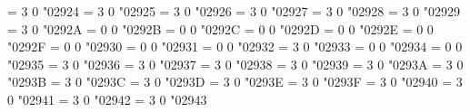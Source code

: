 \Umathchardef\hknearrow = 3 0 "02924 %
\Umathchardef\hksearrow = 3 0 "02925 %
\Umathchardef\hkswarrow = 3 0 "02926 %
\Umathchardef\tona = 3 0 "02927 %
\Umathchardef\toea = 3 0 "02928 %
\Umathchardef\tosa = 3 0 "02929 %
\Umathchardef\towa = 3 0 "0292A %
\Umathchardef\rdiagovfdiag = 0 0 "0292B %
\Umathchardef\fdiagovrdiag = 0 0 "0292C %
\Umathchardef\seovnearrow = 0 0 "0292D %
\Umathchardef\neovsearrow = 0 0 "0292E %
\Umathchardef\fdiagovnearrow = 0 0 "0292F %
\Umathchardef\rdiagovsearrow = 0 0 "02930 %
\Umathchardef\neovnwarrow = 0 0 "02931 %
\Umathchardef\nwovnearrow = 0 0 "02932 %
\Umathchardef\rightcurvedarrow = 3 0 "02933 %
\Umathchardef\uprightcurvearrow = 0 0 "02934 %
\Umathchardef\downrightcurvedarrow = 0 0 "02935 %
\Umathchardef\leftdowncurvedarrow = 3 0 "02936 %
\Umathchardef\rightdowncurvedarrow = 3 0 "02937 %
\Umathchardef\cwrightarcarrow = 3 0 "02938 %
\Umathchardef\acwleftarcarrow = 3 0 "02939 %
\Umathchardef\acwoverarcarrow = 3 0 "0293A %
\Umathchardef\acwunderarcarrow = 3 0 "0293B %
\Umathchardef\curvearrowrightminus = 3 0 "0293C %
\Umathchardef\curvearrowleftplus = 3 0 "0293D %
\Umathchardef\cwundercurvearrow = 3 0 "0293E %
\Umathchardef\ccwundercurvearrow = 3 0 "0293F %
\Umathchardef\acwcirclearrow = 3 0 "02940 %
\Umathchardef\cwcirclearrow = 3 0 "02941 %
\Umathchardef\rightarrowshortleftarrow = 3 0 "02942 %
\Umathchardef\leftarrowshortrightarrow = 3 0 "02943 %
